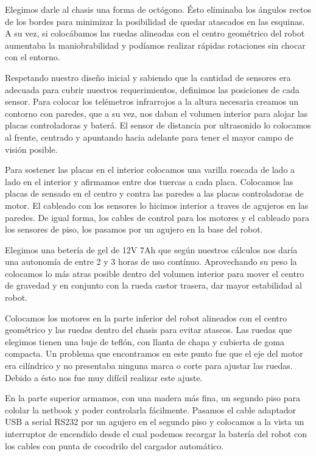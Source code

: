 Elegimos darle al chasis una forma de oct\'ogono.
\'Esto eliminaba los \'angulos rectos de los bordes para minimizar la posibilidad de quedar
atascados en las esquinas.
A su vez, si coloc\'abamos las ruedas alineadas con el centro geom\'etrico del robot aumentaba la
maniobrabilidad y pod\'iamos realizar r\'apidas rotaciones sin chocar con el entorno.

Respetando nuestro dise\~no inicial y sabiendo que la cantidad de sensores era adecuada para cubrir
nuestros requerimientos, definimos las posiciones de cada sensor.
Para colocar los tel\'emetros infrarrojos a la altura necesaria creamos un contorno con paredes,
que a su vez, nos daban el volumen interior para alojar las placas controladoras y bater\'a.
El sensor de distancia por ultrasonido lo colocamos al frente, centrado y apuntando hacia adelante
para tener el mayor campo de visi\'on posible.

Para sostener las placas en el interior colocamos una varilla roscada de lado a lado en el interior
y afirmamos entre dos tuercas a cada placa.
Colocamos las placas de sensado en el centro y contra las paredes a las placas controladoras de motor.
El cableado con los sensores lo hicimos interior a traves de agujeros en las paredes.
De igual forma, los cables de control para los motores y el cableado para los sensores de piso, los
pasamos por un agujero en la base del robot.

Elegimos una beter\'ia de gel de 12V 7Ah que seg\'un nuestros c\'alculos nos dar\'ia una autonom\'ia
de entre 2 y 3 horas de uso cont\'inuo.
Aprovechando su peso la colocamos lo m\'as atras posible dentro del volumen interior para mover
el centro de gravedad y en conjunto con la rueda castor trasera, dar mayor estabilidad al robot.

Colocamos los motores en la parte inferior del robot alineados con el centro geom\'etrico y las
ruedas dentro del chasis para evitar atascos.
Las ruedas que elegimos tienen una buje de tefl\'on, con llanta de chapa y cubierta de goma compacta.
Un problema que encontramos en este punto fue que el eje del motor era cil\'indrico y no presentaba
ninguna marca o corte para ajustar las ruedas.
Debido a \'esto nos fue muy dif\'icil realizar este ajuste.

En la parte superior armamos, con una madera m\'as fina, un segundo piso para cololar la netbook y poder
controlarla f\'acilmente.
Pasamos el cable adaptador USB a serial RS232 por un agujero en el segundo piso y colocamos a la vista
un interruptor de encendido desde el cual podemos recargar la bater\'ia del robot con los cables con
punta de cocodrilo del cargador autom\'atico.

